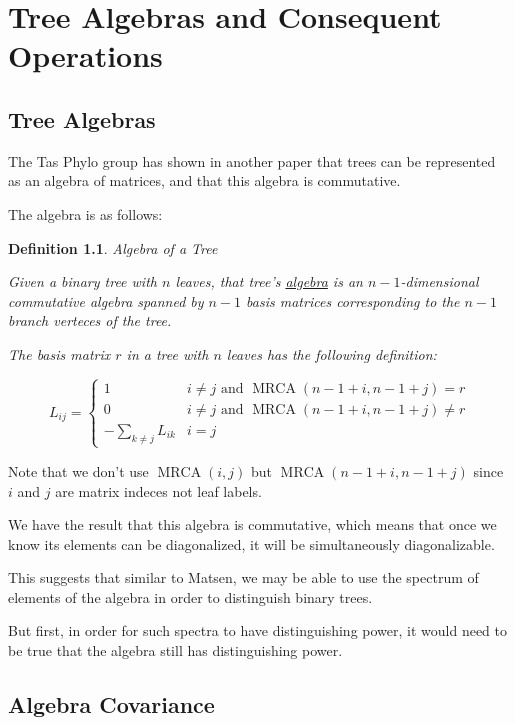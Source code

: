 \documentclass[10pt,a4paper]{report}
\DeclareMathOperator{\MRCA}{MRCA}
\newtheorem{definition}{Definition}
\begin{document}
\chapter{Tree Algebras and Consequent Operations}

\section{Tree Algebras}

The Tas Phylo group has shown in another paper that trees can be represented as
an algebra of matrices, and that this algebra is commutative.

The algebra is as follows:

\begin{definition} Algebra of a Tree

	Given a binary tree with $n$ leaves, that tree's \underline{algebra} is an
	$n-1$-dimensional commutative algebra spanned by $n-1$ basis matrices
	corresponding to the $n-1$ branch verteces of the tree.

	The basis matrix $r$ in a tree with $n$ leaves has the following
	definition:

	\[ L_{ij} = \begin{cases}
		1 & i \neq j \textrm{ and } \MRCA(n-1+i, n-1+j) = r\\
		0 & i \neq j \textrm{ and } \MRCA(n-1+i, n-1+j) \neq r\\
		-\sum_{k \neq j} L_{ik} & i = j
	\end{cases} \]
\end{definition}

Note that we don't use $\MRCA(i, j)$ but $\MRCA(n-1+i, n-1+j)$ since $i$ and
$j$ are matrix indeces not leaf labels.

We have the result that this algebra is commutative, which means that once we
know its elements can be diagonalized, it will be simultaneously
diagonalizable.

This suggests that similar to Matsen, we may be able to use the spectrum of
elements of the algebra in order to distinguish binary trees.

But first, in order for such spectra to have distinguishing power, it would
need to be true that the algebra still has distinguishing power.

\section{Algebra Covariance}
\end{document}
